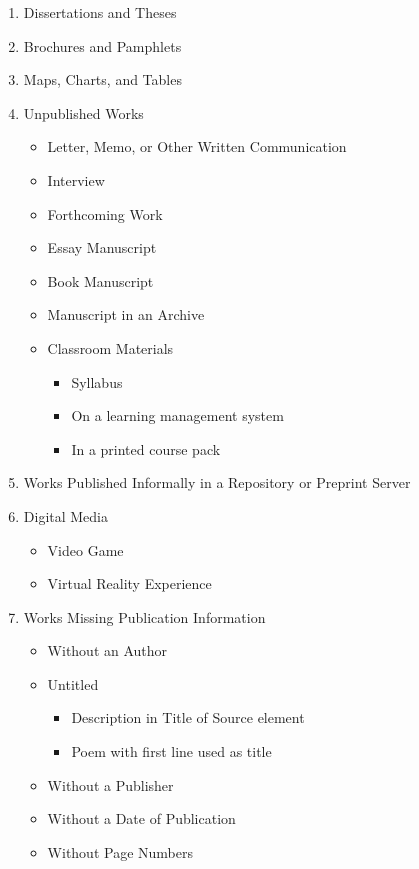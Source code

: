 \documentclass{article}
\begin{document}
\begin{enumerate}
	\item Dissertations and Theses

	\item Brochures and Pamphlets

	\item Maps, Charts, and Tables

	\item Unpublished Works
	\begin{itemize}
		\item Letter, Memo, or Other Written Communication
		\item Interview
		\item Forthcoming Work
		\item Essay Manuscript
		\item Book Manuscript
		\item Manuscript in an Archive
		\item Classroom Materials
		\begin{itemize}
			\item Syllabus
			\item On a learning management system
			\item In a printed course pack
		\end{itemize}
	\end{itemize}
	
	\item Works Published Informally in a Repository or Preprint Server
	
	\item Digital Media
	\begin{itemize}
		\item Video Game
		\item Virtual Reality Experience
	\end{itemize}
	
	\item Works Missing Publication Information
	\begin{itemize}
		\item Without an Author
		\item Untitled
		\begin{itemize}
			\item Description in Title of Source element
			\item Poem with first line used as title
		\end{itemize}
		\item Without a Publisher
		\item Without a Date of Publication
		\item Without Page Numbers
	\end{itemize}
	

\end{enumerate}
\end{document}
